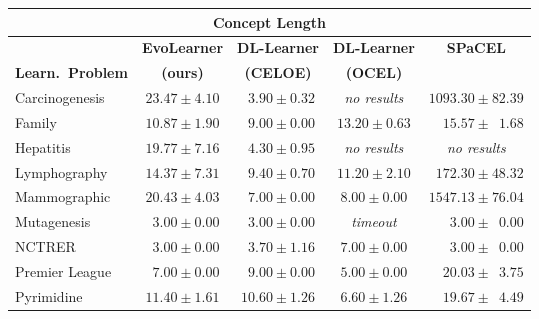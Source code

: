 \begin{table}[tbp]
\begin{tabular}{@{}lcccc@{}}
    \toprule
    \multicolumn{5}{c}{\textbf{Concept Length}} \\
    \midrule
    & \textbf{EvoLearner} & \textbf{DL-Learner} & \textbf{DL-Learner} & \textbf{SPaCEL} \\
    \textbf{Learn.~Problem} & \textbf{(ours)}  & \textbf{(CELOE)} & \textbf{(OCEL)} \\
    \midrule
    Carcinogenesis &  $23.47 \pm 4.10$ &  $\phantom{0}3.90 \pm 0.32$ & \textit{no results} & $1093.30 \pm 82.39$ \\
    Family & $10.87 \pm 1.90$  &  $\phantom{0}9.00 \pm 0.00$ & $13.20 \pm 0.63$ & $\phantom{00}15.57 \pm \phantom{0}1.68$  \\
    Hepatitis & $19.77 \pm 7.16$ & $\phantom{0}4.30 \pm 0.95$ & \textit{no results} & \textit{no results} \\
    Lymphography & $14.37 \pm 7.31$ &  $\phantom{0}9.40 \pm 0.70$ & $11.20 \pm 2.10$  & $\phantom{0}172.30 \pm 48.32$ \\
    Mammographic & $20.43 \pm 4.03$ &  $\phantom{0}7.00 \pm 0.00$ & $8.00 \pm 0.00$ & $1547.13 \pm 76.04$ \\
    Mutagenesis & $\phantom{0}3.00 \pm 0.00$ &  $\phantom{0}3.00 \pm 0.00$ & \textit{timeout} & $\phantom{000}3.00 \pm \phantom{0}0.00$ \\
    NCTRER & $\phantom{0}3.00 \pm 0.00$ &  $\phantom{0}3.70 \pm 1.16$ & $7.00 \pm 0.00$ & $\phantom{000}3.00 \pm \phantom{0}0.00$ \\
    Premier League & $\phantom{0}7.00 \pm 0.00$ & $\phantom{0}9.00 \pm 0.00$ & $5.00 \pm 0.00$ & $\phantom{0}\phantom{0}20.03\pm \phantom{0}3.75$ \\
    Pyrimidine & $11.40 \pm 1.61$  &  $10.60 \pm 1.26$ & $6.60 \pm 1.26$ & $\phantom{00}19.67 \pm \phantom{0}4.49$  \\
    \bottomrule
  \end{tabular}
\end{table}
